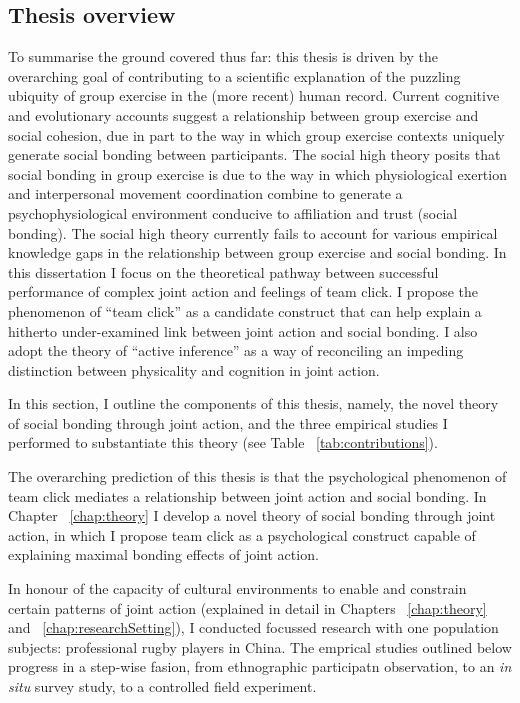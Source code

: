 \begin{CJK}{UTF8}{gbsn}
\section{Thesis overview}
To summarise the ground covered thus far: this thesis is driven by the overarching goal of contributing to a scientific explanation of the puzzling ubiquity of group exercise in the (more recent) human record. Current cognitive and evolutionary accounts suggest a relationship between group exercise and social cohesion, due in part to the way in which group exercise contexts uniquely generate social bonding between participants.  The social high theory posits that social bonding in group exercise is due to the way in which physiological exertion and interpersonal movement coordination combine to generate a psychophysiological environment conducive to affiliation and trust (social bonding).  The social high theory currently fails to account for various empirical knowledge gaps in the relationship between group exercise and social bonding.  In this dissertation I focus on the theoretical pathway between successful performance of complex joint action and feelings of team click.  I propose the phenomenon of ``team click'' as a candidate construct that can help explain a hitherto under-examined link between joint action and social bonding.  I also adopt the theory of ``active inference'' as a way of reconciling an impeding distinction between physicality and cognition in joint action.

In this section, I outline the components of this thesis, namely, the novel theory of social bonding through joint action, and the three empirical studies I performed to substantiate this theory (see Table ~\ref{tab:contributions}).




  The overarching prediction of this thesis is that the psychological phenomenon of team click mediates a relationship between joint action and social bonding.  In Chapter ~\ref{chap:theory} I develop a novel theory of social bonding through joint action, in which I propose team click as a psychological construct capable of explaining maximal bonding effects of joint action.


In honour of the capacity of cultural environments to enable and constrain certain patterns of joint action (explained in detail in Chapters ~\ref{chap:theory} and ~\ref{chap:researchSetting}), I conducted focussed research with one population subjects: professional rugby players in China.  The emprical studies outlined below progress in a step-wise fasion, from ethnographic participatn observation, to an \textit{in situ} survey study, to a controlled field experiment.


\end{CJK}
